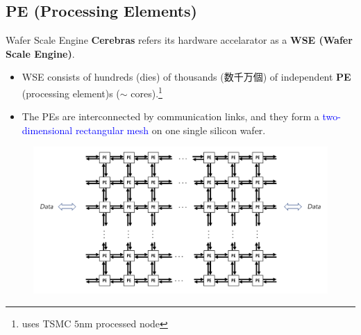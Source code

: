 \documentclass[dvipdfmx, 11pt, aspectratio=169]{beamer}   %
\begin{document}
\subsection{PE (Processing Elements)}
\begin{frame}{Wafer Scale Engine}
\textbf{Cerebras} refers its hardware accelarator as a \textbf{WSE (Wafer Scale Engine)}.
\begin{itemize}
    \item WSE consists of hundreds (dies) of thousands (数千万個) of independent \textbf{PE} (processing element)s ($\sim$ cores).\footnote{uses TSMC $5$nm processed node}
    \item The PEs are interconnected by communication links, and they form a \textcolor{blue}{two-dimensional rectangular mesh} on one single silicon wafer.
\end{itemize}
\begin{figure}
    \includegraphics[scale=0.14]{img/cs-mesh.png}
\end{figure}
\end{frame}
\end{document}
